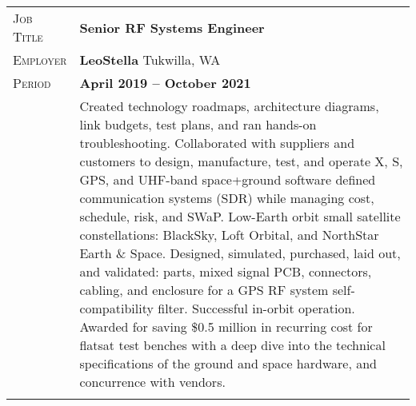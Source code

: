 \documentclass[a4paper, oneside, final]{scrartcl}
\newcommand{\gray}{\rowcolor[gray]{.90}} %
\begin{document}
\begin{center}
\begin{tabularx}{0.97\linewidth}{>{\raggedleft\scshape}p{2cm}X}
\gray Job Title & \textbf{Senior RF Systems Engineer}\\
\gray Employer & \textbf{LeoStella} \hfill Tukwilla, WA\\
\gray Period & \textbf{April 2019 -- October 2021}\\
&
\vspace{-0.15 cm}
Created technology roadmaps, architecture diagrams, link budgets, test plans, and ran hands-on troubleshooting. Collaborated with suppliers and customers to design, manufacture, test, and operate X, S, GPS, and UHF-band space+ground software defined communication systems (SDR) while managing cost, schedule, risk, and SWaP.  Low-Earth orbit small satellite constellations: BlackSky, Loft Orbital, and NorthStar Earth \& Space.
\newline
\newline
Designed, simulated, purchased, laid out, and validated: parts, mixed signal PCB, connectors, cabling, and enclosure for a GPS RF system self-compatibility filter.  Successful in-orbit operation.
\newline
\newline
Awarded for saving \$0.5 million in recurring cost for flatsat test benches with a deep dive into the technical specifications of the ground and space hardware, and concurrence with vendors.
\\
\\
\end{tabularx}


\end{center}
\end{document}
